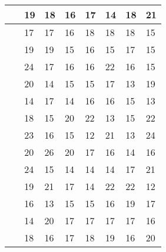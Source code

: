 \documentclass[12pt]{article} %
\begin{document}
\begin{sidewaystable}
\begin{tabular}{|l|l|l|l|l|l|l|l|}
    ~                  & 19          & 18                         & 16          & 17          & 14          & 18          & 21          \\ \hline
    ~                  & 17          & 17                         & 16          & 18          & 18          & 18          & 15          \\ \hline
    ~                  & 19          & 19                         & 15          & 16          & 15          & 17          & 15          \\ \hline
    ~                  & 24          & 17                         & 16          & 16          & 22          & 16          & 15          \\ \hline
    ~                  & 20          & 14                         & 15          & 15          & 17          & 13          & 19          \\ \hline
    ~                  & 14          & 17                         & 14          & 16          & 16          & 15          & 13          \\ \hline
    ~                  & 18          & 15                         & 20          & 22          & 13          & 15          & 22          \\ \hline
    ~                  & 23          & 16                         & 15          & 12          & 21          & 13          & 24          \\ \hline
    ~                  & 20          & 26                         & 20          & 17          & 16          & 14          & 16          \\ \hline
    ~                  & 24          & 15                         & 14          & 14          & 14          & 17          & 21          \\ \hline
    ~                  & 19          & 21                         & 17          & 14          & 22          & 22          & 12          \\ \hline
    ~                  & 16          & 13                         & 15          & 15          & 16          & 19          & 17          \\ \hline
    ~                  & 14          & 20                         & 17          & 17          & 17          & 17          & 16          \\ \hline
    ~                  & 18          & 16                         & 17          & 18          & 19          & 16          & 20          \\ \hline

\end{tabular}
\end{sidewaystable}
\end{document}
